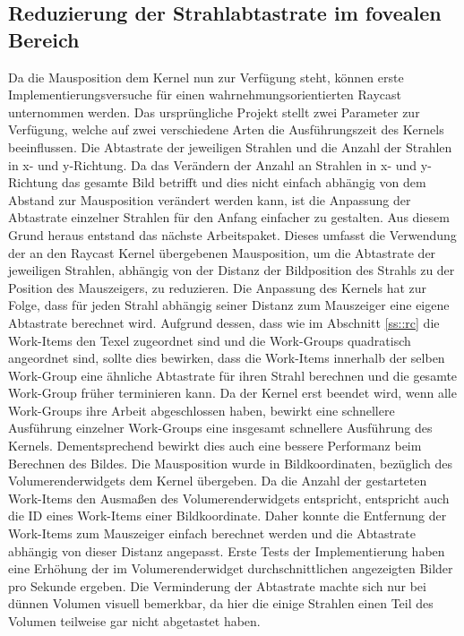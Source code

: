\subsection{Reduzierung der Strahlabtastrate im fovealen Bereich}
Da die Mausposition dem Kernel nun zur Verfügung steht, können erste Implementierungsversuche für einen wahrnehmungsorientierten Raycast unternommen werden.
Das ursprüngliche Projekt stellt zwei Parameter zur Verfügung, welche auf zwei verschiedene Arten die Ausführungszeit des Kernels beeinflussen.
Die Abtastrate der jeweiligen Strahlen und die Anzahl der Strahlen in x- und y-Richtung.
Da das Verändern der Anzahl an Strahlen in x- und y- Richtung das gesamte Bild betrifft und dies nicht einfach abhängig von dem Abstand zur Mausposition verändert werden kann, ist die Anpassung der Abtastrate einzelner Strahlen für den Anfang einfacher zu gestalten.
Aus diesem Grund heraus entstand das nächste Arbeitspaket.
Dieses umfasst die Verwendung der an den Raycast Kernel übergebenen Mausposition, um die Abtastrate der jeweiligen Strahlen, abhängig von der Distanz der Bildposition des Strahls zu der Position des Mauszeigers, zu reduzieren.
Die Anpassung des Kernels hat zur Folge, dass für jeden Strahl abhängig seiner Distanz zum Mauszeiger eine eigene Abtastrate berechnet wird.
Aufgrund dessen, dass wie im Abschnitt \ref{ss::rc} die Work-Items den Texel zugeordnet sind und die Work-Groups quadratisch angeordnet sind, sollte dies bewirken, dass die Work-Items innerhalb der selben Work-Group eine ähnliche Abtastrate für ihren Strahl berechnen und die gesamte Work-Group früher terminieren kann.
Da der Kernel erst beendet wird, wenn alle Work-Groups ihre Arbeit abgeschlossen haben, bewirkt eine schnellere Ausführung einzelner Work-Groups eine insgesamt schnellere Ausführung des Kernels.
Dementsprechend bewirkt dies auch eine bessere Performanz beim Berechnen des Bildes.
Die Mausposition wurde in Bildkoordinaten, bezüglich des Volumerenderwidgets dem Kernel übergeben.
Da die Anzahl der gestarteten Work-Items den Ausmaßen des Volumerenderwidgets entspricht, entspricht auch die ID eines Work-Items einer Bildkoordinate.
Daher konnte die Entfernung der Work-Items zum Mauszeiger einfach berechnet werden und die Abtastrate abhängig von dieser Distanz angepasst.
Erste Tests der Implementierung haben eine Erhöhung der im Volumerenderwidget durchschnittlichen angezeigten Bilder pro Sekunde ergeben.
Die Verminderung der Abtastrate machte sich nur bei dünnen Volumen visuell bemerkbar, da hier die einige Strahlen einen Teil des Volumen teilweise gar nicht abgetastet haben.

